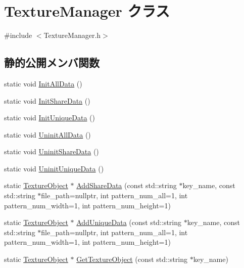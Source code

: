 \hypertarget{class_texture_manager}{}\section{Texture\+Manager クラス}
\label{class_texture_manager}


{\ttfamily \#include $<$Texture\+Manager.\+h$>$}

\subsection*{静的公開メンバ関数}
\begin{DoxyCompactItemize}
\item 
static void \mbox{\hyperlink{class_texture_manager_aee4c784f3f32bfe810bf66313735dece}{Init\+All\+Data}} ()
\item 
static void \mbox{\hyperlink{class_texture_manager_aed1e9666d0ef8698db754280a1d4bad4}{Init\+Share\+Data}} ()
\item 
static void \mbox{\hyperlink{class_texture_manager_abfba2c4293e692a351d9b98e28f6ed31}{Init\+Unique\+Data}} ()
\item 
static void \mbox{\hyperlink{class_texture_manager_a5e81df5cd89e7794fb9230357663a729}{Uninit\+All\+Data}} ()
\item 
static void \mbox{\hyperlink{class_texture_manager_a770b76a28bac4c20c16960f58a2d3b77}{Uninit\+Share\+Data}} ()
\item 
static void \mbox{\hyperlink{class_texture_manager_a9d9dd61edf4153bd70ba830ae2dc62e8}{Uninit\+Unique\+Data}} ()
\item 
static \mbox{\hyperlink{class_texture_object}{Texture\+Object}} $\ast$ \mbox{\hyperlink{class_texture_manager_a571c5b288fe16c53965f45d8bd7c8769}{Add\+Share\+Data}} (const std\+::string $\ast$key\+\_\+name, const std\+::string $\ast$file\+\_\+path=nullptr, int pattern\+\_\+num\+\_\+all=1, int pattern\+\_\+num\+\_\+width=1, int pattern\+\_\+num\+\_\+height=1)
\item 
static \mbox{\hyperlink{class_texture_object}{Texture\+Object}} $\ast$ \mbox{\hyperlink{class_texture_manager_af86003fd2afaf09f0295745d486e42e4}{Add\+Unique\+Data}} (const std\+::string $\ast$key\+\_\+name, const std\+::string $\ast$file\+\_\+path=nullptr, int pattern\+\_\+num\+\_\+all=1, int pattern\+\_\+num\+\_\+width=1, int pattern\+\_\+num\+\_\+height=1)
\item 
static \mbox{\hyperlink{class_texture_object}{Texture\+Object}} $\ast$ \mbox{\hyperlink{class_texture_manager_a18d1f3418511075804f9d11cff1010ff}{Get\+Texture\+Object}} (const std\+::string $\ast$key\+\_\+name)
\end{DoxyCompactItemize}


